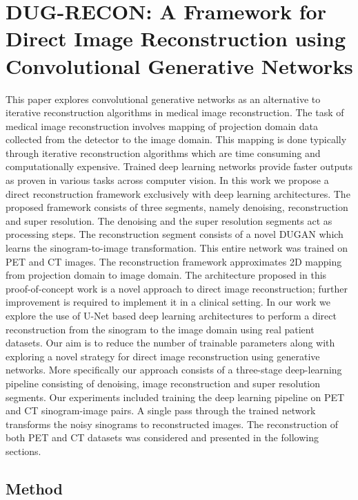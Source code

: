 
\chapter{DUG-RECON: A Framework for Direct Image Reconstruction using Convolutional Generative Networks} %
\label{Chapter3} %


This paper explores convolutional generative networks as an alternative to iterative reconstruction algorithms in medical image reconstruction. The task of medical image reconstruction involves mapping of projection domain data collected from the detector to the image domain. This mapping is done typically through iterative reconstruction algorithms which are time consuming and computationally expensive. Trained deep learning networks provide faster outputs as proven in various tasks across computer vision. In this work we propose a direct reconstruction framework exclusively with deep learning architectures. The proposed framework consists of three segments, namely denoising, reconstruction and super resolution. The denoising and the super resolution segments act as processing steps. The reconstruction segment consists of a novel \ac{DUGAN} which learns the sinogram-to-image transformation. This entire network was trained on \ac{PET} and \ac{CT} images. The reconstruction framework approximates \ac{2D} mapping from projection domain to image domain. The architecture proposed in this proof-of-concept work is a novel approach to direct image reconstruction; further improvement is required to implement it in a clinical setting. In our work we explore the use of U-Net  based deep learning architectures \cite{ronneberger2015u} to perform a direct reconstruction from the sinogram to the image domain using real patient datasets. Our aim is to reduce the number of trainable parameters along with exploring a novel strategy for direct image reconstruction using generative networks. More specifically our approach consists of a three-stage deep-learning pipeline consisting of denoising, image reconstruction and super resolution segments. Our experiments included training the deep learning pipeline on \ac{PET} and \ac{CT} sinogram-image pairs. A single pass through the trained network transforms the noisy sinograms to reconstructed images. The reconstruction of both \ac{PET} and \ac{CT} datasets was considered and presented in the following sections.

\section{Method}


